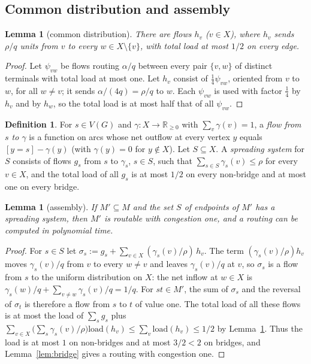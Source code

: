\documentclass[11pt,letterpaper]{article}
\newtheorem{lemma}[theorem]{Lemma}
\theoremstyle{definition}
\newtheorem{definition}[theorem]{Definition}
\newcommand{\R}{\mathbb{R}}
\newcommand{\load}{\mathrm{load}}
\begin{document}
\subsection{Common distribution and assembly}\label{sec:assembly}

\begin{lemma}[common distribution]\label{lem:common}
There are flows $h_v$ ($v\in X$), where $h_v$ sends $\rho/q$ units from $v$ to every
$w\in X\setminus\{v\}$, with total load at most $1/2$ on every edge.
\end{lemma}
\begin{proof}
Let $\psi_{vw}$ be flows routing $\alpha/q$ between every pair $\{v,w\}$ of distinct
terminals with total load at most one. Let $h_v$ consist of $\frac14\psi_{vw}$, oriented from
$v$ to $w$, for all $w\ne v$; it sends $\alpha/(4q)=\rho/q$ to $w$. Each $\psi_{vw}$ is used
with factor $\frac14$ by $h_v$ and by $h_w$, so the total load is at most half that of all
$\psi_{vw}$.
\end{proof}

\begin{definition}
For $s\in V(G)$ and $\gamma:X\to\R_{\ge0}$ with $\sum_v\gamma(v)=1$, a \emph{flow from $s$ to
$\gamma$} is a function on arcs whose net outflow at every vertex $y$ equals
$[y=s]-\gamma(y)$ (with $\gamma(y)=0$ for $y\notin X$). Let $S\subseteq X$. A \emph{spreading
system} for $S$ consists of flows $g_s$ from $s$ to $\gamma_s$, $s\in S$, such that
$\sum_{s\in S}\gamma_s(v)\le\rho$ for every $v\in X$, and the total load of all $g_s$ is at
most $1/2$ on every non-bridge and at most one on every bridge.
\end{definition}

\begin{lemma}[assembly]\label{lem:assembly}
If $M'\subseteq M$ and the set $S$ of endpoints of $M'$ has a spreading system, then $M'$ is
routable with congestion one, and a routing can be computed in polynomial time.
\end{lemma}
\begin{proof}
For $s\in S$ let $\sigma_s:=g_s+\sum_{v\in X}(\gamma_s(v)/\rho)\,h_v$. The term
$(\gamma_s(v)/\rho)h_v$ moves $\gamma_s(v)/q$ from $v$ to every $w\ne v$ and leaves
$\gamma_s(v)/q$ at $v$, so $\sigma_s$ is a flow from $s$ to the uniform distribution on $X$: the net inflow at
$w\in X$ is $\gamma_s(w)/q+\sum_{v\ne w}\gamma_s(v)/q=1/q$. For $st\in M'$, the
sum of $\sigma_s$ and the reversal of $\sigma_t$ is therefore a flow from $s$ to $t$ of value
one. The total load of all these flows is at most the load of $\sum_s g_s$ plus
$\sum_{v\in X}\bigl(\sum_{s}\gamma_s(v)/\rho\bigr)\load(h_v)\le\sum_v\load(h_v)\le 1/2$ by
Lemma~\ref{lem:common}. Thus the load is at most $1$ on non-bridges and at most $3/2<2$ on
bridges, and Lemma~\ref{lem:bridge} gives a routing with congestion one.
\end{proof}
\end{document}
